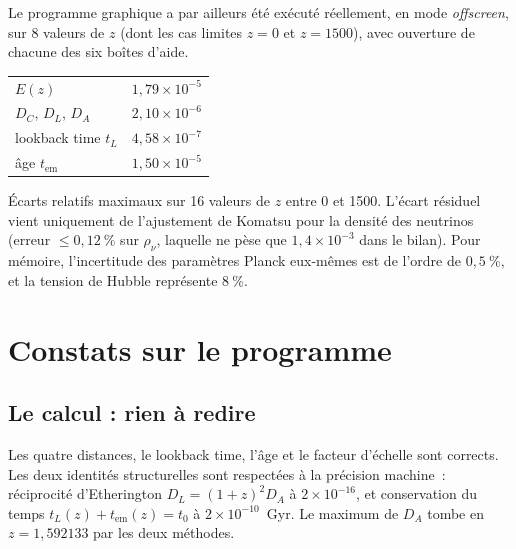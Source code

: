 \documentclass[11pt,a4paper]{report}
\begin{document}
\noindent Le programme graphique a par ailleurs été exécuté réellement, en mode
\emph{offscreen}, sur 8 valeurs de $z$ (dont les cas limites $z=0$ et
$z=1500$), avec ouverture de chacune des six boîtes d'aide.

\begin{tcolorbox}[ok,title={Résultat de la comparaison astropy $\leftrightarrow$ SageMath}]
\centering
\begin{tabular}{lr}
\toprule
$E(z)$ & $1{,}79\times10^{-5}$ \\
$D_{C}$, $D_{L}$, $D_{A}$ & $2{,}10\times10^{-6}$ \\
lookback time $t_{L}$ & $4{,}58\times10^{-7}$ \\
âge $t_{\text{em}}$ & $1{,}50\times10^{-5}$ \\
\bottomrule
\end{tabular}

\medskip
\raggedright\small Écarts relatifs maximaux sur 16 valeurs de $z$ entre 0 et
1500. L'écart résiduel vient uniquement de l'ajustement de Komatsu pour la
densité des neutrinos (erreur $\le 0{,}12~\%$ sur $\rho_{\nu}$, laquelle ne pèse
que $1{,}4\times10^{-3}$ dans le bilan). Pour mémoire, l'incertitude des
paramètres Planck eux-mêmes est de l'ordre de $0{,}5~\%$, et la tension de
Hubble représente $8~\%$.
\end{tcolorbox}

\chapter{Constats sur le programme}

\section{Le calcul : rien à redire}

\begin{tcolorbox}[ok,title={P0 --- aucune erreur de calcul détectée}]
Les quatre distances, le lookback time, l'âge et le facteur d'échelle sont
corrects. Les deux identités structurelles sont respectées à la précision
machine~: réciprocité d'Etherington $D_{L} = (1+z)^{2}D_{A}$ à
$2\times10^{-16}$, et conservation du temps $t_{L}(z) + t_{\text{em}}(z) = t_{0}$
à $2\times10^{-10}$~Gyr. Le maximum de $D_{A}$ tombe en $z = 1{,}592133$ par les
deux méthodes.
\end{tcolorbox}
\end{document}
